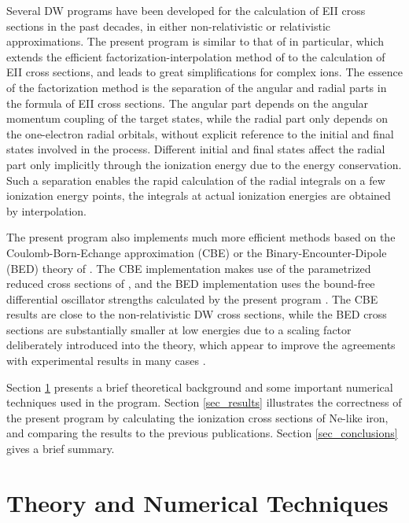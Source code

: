\documentclass[preprint, floatfix, pra, showpacs, showkeys]{revtex4}
\begin{document}
Several DW programs have been developed for the calculation of EII cross
sections in the past decades, in either non-relativistic \cite{younger80} or
relativistic \cite{pindzola88, sampson91} approximations. The present program
is similar to that of \textcite{sampson91} in particular,  which extends the
efficient factorization-interpolation method of \textcite{barshalom88} to the
calculation of EII cross sections, and leads to great simplifications for
complex ions. The essence of the factorization method is the separation of
the angular and radial parts in the formula of EII cross sections. The angular
part depends on the angular momentum coupling of the target states, while the
radial part only depends on the one-electron radial orbitals, without
explicit reference to the initial and final states involved in the
process. Different initial and final states affect the radial part only
implicitly through the ionization energy due to the energy conservation. Such
a separation enables the rapid calculation of the radial integrals on a few
ionization energy points, the integrals at actual ionization energies are
obtained by interpolation.  

The present program also implements much more efficient methods based on the
Coulomb-Born-Echange approximation (CBE) or the Binary-Encounter-Dipole (BED)
theory of \textcite{kim94}. The CBE implementation makes use of the
parametrized reduced cross sections of \textcite{golden77, golden80}, and the
BED implementation uses the bound-free differential oscillator strengths
calculated by the present program \cite{gu02c}. The CBE results are close to
the non-relativistic DW cross sections, while the BED cross sections are
substantially smaller at low energies due to a scaling factor deliberately
introduced into the theory, which appear to improve the agreements with
experimental results in many cases \cite{kim94}.
 
Section \ref{sec_theory} presents a brief theoretical background and some
important numerical techniques used in the program. Section \ref{sec_results}
illustrates the correctness of the present program by calculating the
ionization cross sections of Ne-like iron, and comparing the results to the
previous publications. Section \ref{sec_conclusions} gives a brief summary.

\section{Theory and Numerical Techniques}
\label{sec_theory}
\end{document}
